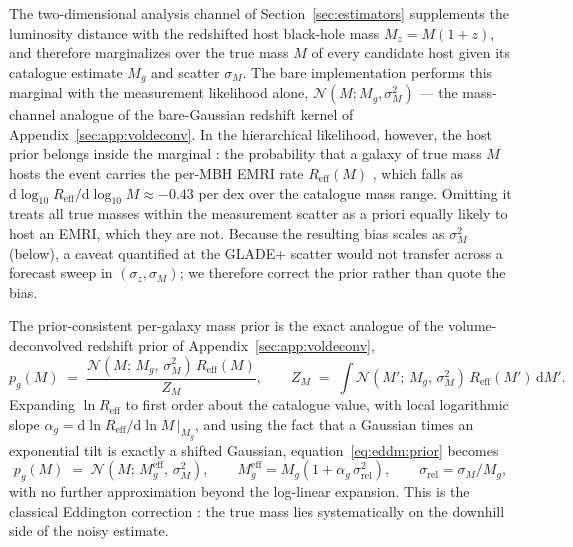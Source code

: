 The two-dimensional analysis channel of Section~\ref{sec:estimators} supplements the
luminosity distance with the redshifted host black-hole mass $M_z = M(1+z)$, and therefore
marginalizes over the true mass $M$ of every candidate host given its catalogue estimate
$M_g$ and scatter $\sigma_M$. The bare implementation performs this marginal with the
measurement likelihood alone, $\mathcal{N}(M;M_g,\sigma_M^2)$ --- the mass-channel analogue
of the bare-Gaussian redshift kernel of Appendix~\ref{sec:app:voldeconv}. In the hierarchical
likelihood, however, the host prior belongs inside the marginal
\citep[eq.~A10 of][]{Gray:2019ksv}: the probability that a galaxy of true mass $M$ hosts the
event carries the per-MBH EMRI rate $R_{\mathrm{eff}}(M)$ \citep{Babak:2017tow}, which falls as
$\mathrm{d}\log_{10}R_{\mathrm{eff}}/\mathrm{d}\log_{10}M \approx -0.43$ per dex over the
catalogue mass range. %
Omitting it treats all true masses within the measurement scatter as a priori equally likely
to host an EMRI, which they are not. Because the resulting bias scales as $\sigma_M^2$
(below), a caveat quantified at the GLADE+ scatter would not transfer across a forecast sweep
in $(\sigma_z,\sigma_M)$; we therefore correct the prior rather than quote the bias.

The prior-consistent per-galaxy mass prior is the exact analogue of the volume-deconvolved
redshift prior of Appendix~\ref{sec:app:voldeconv},
\begin{equation}
  p_g(M) \;=\; \frac{\mathcal{N}\!\left(M;\,M_g,\,\sigma_M^2\right)\,R_{\mathrm{eff}}(M)}{Z_M},
  \qquad
  Z_M \;=\; \int \mathcal{N}\!\left(M';\,M_g,\,\sigma_M^2\right)\,R_{\mathrm{eff}}(M')\,\mathrm{d}M' .
  \label{eq:eddm:prior}
\end{equation}
Expanding $\ln R_{\mathrm{eff}}$ to first order about the catalogue value, with local
logarithmic slope $\alpha_g = \mathrm{d}\ln R_{\mathrm{eff}}/\mathrm{d}\ln M\,|_{M_g}$, and
using the fact that a Gaussian times an exponential tilt is exactly a shifted Gaussian,
equation~\eqref{eq:eddm:prior} becomes
\begin{equation}
  p_g(M) \;=\; \mathcal{N}\!\left(M;\,M_g^{\mathrm{eff}},\,\sigma_M^2\right),
  \qquad
  M_g^{\mathrm{eff}} = M_g\left(1 + \alpha_g\,\sigma_{\mathrm{rel}}^2\right),
  \qquad
  \sigma_{\mathrm{rel}} = \sigma_M/M_g ,
  \label{eq:eddm:tilt}
\end{equation}
with no further approximation beyond the log-linear expansion. This is the classical
Eddington correction \citep{Eddington1913}: the true mass lies
systematically on the downhill side of the noisy estimate.

